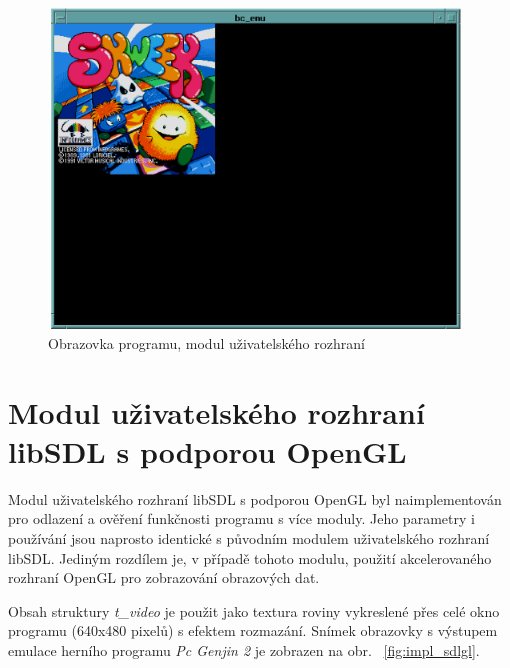 \begin{figure}[hb]
\begin{center}
\includegraphics[width=11cm,height=8.5cm]{fig/impl_sdl}
\caption{Obrazovka programu, modul uživatelského rozhraní
	\label{fig:impl_sdl}}
\end{center}
\end{figure}


\section{Modul uživatelského rozhraní libSDL s podporou
OpenGL}\label{chap:impl_sdlgl}

Modul uživatelského rozhraní libSDL s podporou OpenGL byl naimplementován pro
odlazení a ověření funkčnosti programu s více moduly. Jeho parametry i
používání jsou naprosto identické s původním modulem uživatelského rozhraní
libSDL. Jediným rozdílem je, v případě tohoto modulu, použití akcelerovaného
rozhraní OpenGL pro zobrazování obrazových dat.

Obsah struktury {\em t\_video} je použit jako textura roviny vykreslené přes
celé okno programu (640x480 pixelů) s efektem rozmazání. Snímek obrazovky
s výstupem emulace herního programu {\em Pc Genjin 2} je zobrazen na obr.
~\ref{fig:impl_sdlgl}.

